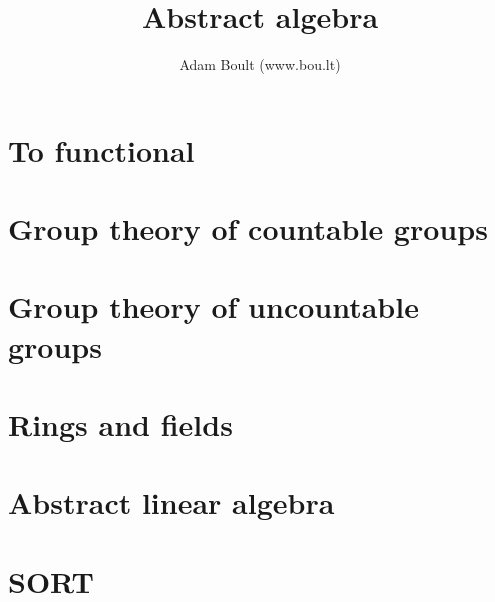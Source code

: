 \documentclass[oneside]{book}
\begin{document}
\author{Adam Boult (www.bou.lt)}
\title{Abstract algebra}
\maketitle

\setcounter{tocdepth}{0}
\tableofcontents



\part{To functional}



\part{Group theory of countable groups}










\part{Group theory of uncountable groups}



\part{Rings and fields}



\part{Abstract linear algebra}










\part{SORT}

\end{document}
